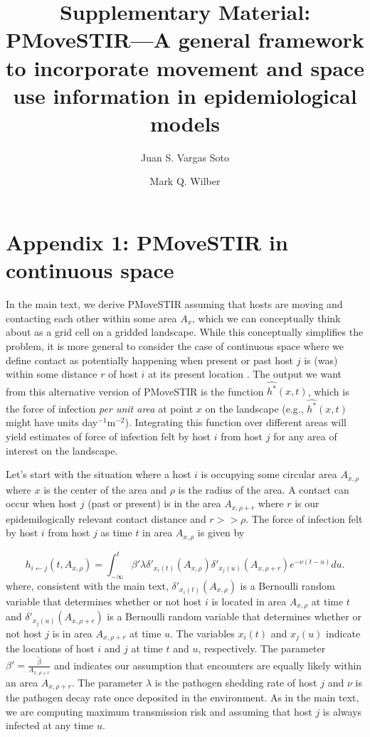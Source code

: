 \documentclass[letterpaper]{article}
\title{Supplementary Material: PMoveSTIR---A general framework to incorporate movement and space use information in epidemiological models}
\author{Juan S. Vargas Soto \and Mark Q. Wilber}
\affil{School of Natural Resources, University of Tennessee, Knoxville, TN}
\date{}
\begin{document}
\doublespacing
\linenumbers

\section*{Appendix 1: PMoveSTIR in continuous space}

In the main text, we derive PMoveSTIR assuming that hosts are moving and contacting each other within some area $A_x$, which we can conceptually think about as a grid cell on a gridded landscape.  While this conceptually simplifies the problem, it is more general to consider the case of continuous space where we define contact as potentially happening when present or past host $j$ is (was) within some distance $r$ of host $i$ at its present location \citep{Wilber2022}.  The output we want from this alternative version of PMoveSTIR is the function $\hat{h^*}(x, t)$, which is the force of infection \emph{per unit area} at point $x$ on the landscape (e.g., $\hat{h^*}(x, t)$ might have units day$^{-1}\text{m}^{-2}$).  Integrating this function over different areas will yield estimates of force of infection felt by host $i$ from host $j$ for any area of interest on the landscape.

Let's start with the situation where a host $i$ is occupying some circular area $A_{x, \rho}$ where $x$ is the center of the area and $\rho$ is the radius of the area.  A contact can occur when host $j$ (past or present) is in the area $A_{x, \rho + r}$ where $r$ is our epidemilogically relevant contact distance and $r >> \rho$.  The force of infection felt by host $i$ from host $j$ as time $t$ in area $A_{x, \rho}$ is given by

\begin{equation}
    h_{i \leftarrow j}(t, A_{x, \rho}) = \int_{-\infty}^{t} \beta' \lambda \delta'_{x_i(t)}(A_{x, \rho}) \delta'_{x_j(u)}(A_{x, \rho + r}) e^{-\nu(t - u)} du.
    \label{eq:prob_foi}
\end{equation} 
where, consistent with the main text, $\delta'_{x_i(t)}(A_{x, \rho})$ is a Bernoulli random variable that determines whether or not host $i$ is located in area $A_{x, \rho}$ at time $t$ and $\delta'_{x_j(u)}(A_{x, \rho + r})$ is a Bernoulli random variable that determines whether or not host $j$ is in area $A_{x, \rho + r}$ at time $u$.  The variables $x_i(t)$ and $x_j(u)$ indicate the locations of host $i$ and $j$ at time $t$ and $u$, respectively.  The parameter $\beta' = \frac{\tilde{\beta}}{A_{x, \rho + r}}$ and indicates our assumption that encounters are equally likely within an area $A_{x, \rho + r}$. The parameter $\lambda$ is the pathogen shedding rate of host $j$ and $\nu$ is the pathogen decay rate once deposited in the environment.  As in the main text, we are computing maximum transmission risk and assuming that host $j$ is always infected at any time $u$.
\end{document}
